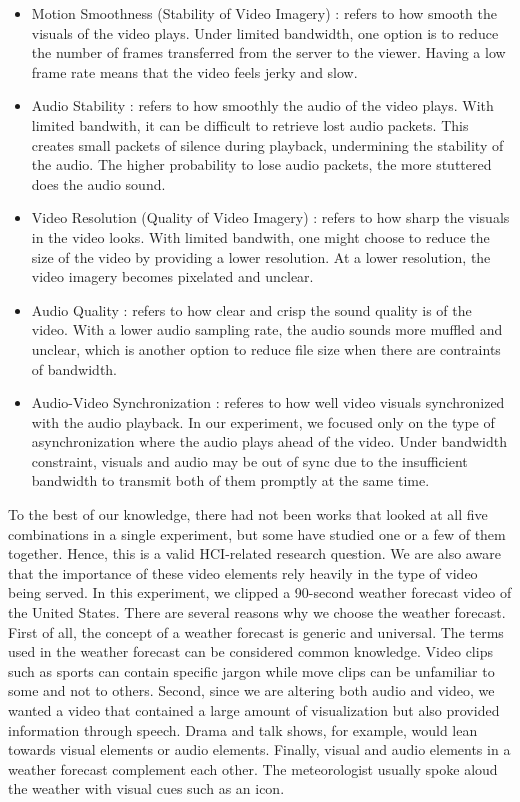 \begin{itemize}
    \item Motion Smoothness (Stability of Video Imagery) \cite{claypool1999effects}: refers to how smooth the visuals of the video plays. Under limited bandwidth, one option is to reduce the number of frames transferred from the server to the viewer. Having a low frame rate means that the video feels jerky and slow.
    \item Audio Stability \cite{claypool1999effects}: refers to how smoothly the audio of the video plays. With limited bandwith, it can be difficult to retrieve lost audio packets. This creates small packets of silence during playback, undermining the stability of the audio. The higher probability to lose audio packets, the more stuttered does the audio sound.
    \item Video Resolution (Quality of Video Imagery) \cite{oeldorf2012bad, knoche2008low}: refers to how sharp the visuals in the video looks. With limited bandwith, one might choose to reduce the size of the video by providing a lower resolution. At a lower resolution, the video imagery becomes pixelated and unclear. 
    \item Audio Quality \cite{oeldorf2012bad, noll1993wideband}: refers to how clear and crisp the sound quality is of the video. With a lower audio sampling rate, the audio sounds more muffled and unclear, which is another option to reduce file size when there are contraints of bandwidth.
    \item Audio-Video Synchronization \cite{steinmetz1996human}: referes to how well video visuals synchronized with the audio playback. In our experiment, we focused only on the type of asynchronization where the audio plays ahead of the video. Under bandwidth constraint, visuals and audio may be out of sync due to the insufficient bandwidth to transmit both of them promptly at the same time.
\end{itemize}

To the best of our knowledge, there had not been works that looked at all five combinations in a single experiment, but some have studied one or a few of them together. Hence, this is a valid HCI-related research question. We are also aware that the importance of these video elements rely heavily in the type of video being served. In this experiment, we clipped a 90-second weather forecast video of the United States. There are several reasons why we choose the weather forecast. First of all, the concept of a weather forecast is generic and universal. The terms used in the weather forecast can be considered common knowledge. Video clips such as sports can contain specific jargon while move clips can be unfamiliar to some and not to others. Second, since we are altering both audio and video, we wanted a video that contained a large amount of visualization but also provided information through speech. Drama and talk shows, for example, would lean towards visual elements or audio elements. Finally, visual and audio elements in a weather forecast complement each other. The meteorologist usually spoke aloud the weather with visual cues such as an icon.

